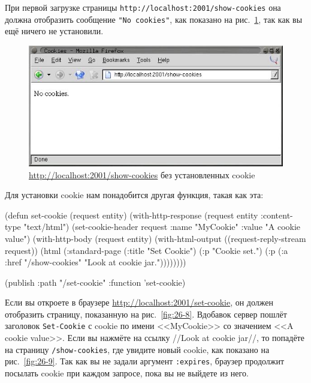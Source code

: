 При первой загрузке страницы \lstinline{http://localhost:2001/show-cookies} она должна
отобразить сообщение \lstinline{"No cookies"}, как показано на рис.~\ref{fig:26-7}, так как
вы ещё ничего не установили.

\begin{figure}[htb]
  \centering
  \includegraphics[scale=0.7]{images/show-cookies-no-cookies.jpg}
  \caption{\url{http://localhost:2001/show-cookies} без установленных cookie}
  \label{fig:26-7}
\end{figure}

Для установки cookie нам понадобится другая функция, такая как эта:

\begin{myverb}
(defun set-cookie (request entity)
  (with-http-response (request entity :content-type "text/html")
    (set-cookie-header request :name "MyCookie" :value "A cookie value")
    (with-http-body (request entity)
      (with-html-output ((request-reply-stream request))
        (html 
          (:standard-page
           (:title "Set Cookie")
           (:p "Cookie set.")
           (:p (:a :href "/show-cookies" "Look at cookie jar."))))))))

(publish :path "/set-cookie" :function 'set-cookie)
\end{myverb}

Если вы откроете в браузере \url{http://localhost:2001/set-cookie}, он должен отобразить
страницу, показанную на рис.~\ref{fig:26-8}. Вдобавок сервер пошлёт заголовок
\lstinline{Set-Cookie} с cookie по имени <<MyCookie>> со значением <<A cookie value>>. Если вы
нажмёте на ссылку //Look at cookie jar//, то попадёте на страницу \lstinline{/show-cookies},
где увидите новый cookie, как показано на рис.~\ref{fig:26-9}. Так как вы не задали
аргумент \lstinline{:expires}, браузер продолжит посылать cookie при каждом запросе, пока вы не
выйдете из него.

